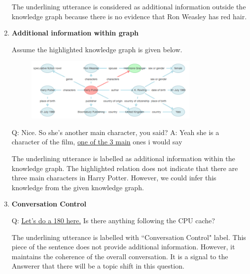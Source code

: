\documentclass[bsc,frontabs,twoside,singlespacing,parskip,deptreport]{infthesis}     %
\begin{document}
\begin{enumerate}
The underlining utterance is considered as additional information outside the knowledge graph because there is no evidence that Ron Weasley has red hair.


\item \textbf{Additional information within graph}

Assume the highlighted knowledge graph is given below.

\begin{figure}[h]
    \centering
    \includegraphics[width=0.8\textwidth]{aiwg.png}
\end{figure}

\begin{exe}
	\ex
		\begin{xlist}
			\ex \label{aiwgq1} Q: Nice. So she's another main character, you said?
			\ex \label{aiwga1} A: Yeah she is a character of the film, \underline{one of the 3 main} ones i would say
\end{xlist}
\end{exe}

The underlining utterance is labelled as additional information within the knowledge graph. The highlighted relation does not indicate that there are three main characters in Harry Potter. However, we could infer this knowledge from the given knowledge graph.



\item \textbf{Conversation Control}

\begin{exe}
	\ex
		\begin{xlist}
			\ex \label{ccq1} Q: \underline{Let's do a 180 here.} Is there anything following the CPU cache?
\end{xlist}
\end{exe}

The underlining utterance is labelled with ``Conversation Control" label. This piece of the sentence does not provide additional information. However, it maintains the coherence of the overall conversation. It is a signal to the Answerer that there will be a topic shift in this question.



\end{enumerate}
\end{document}
